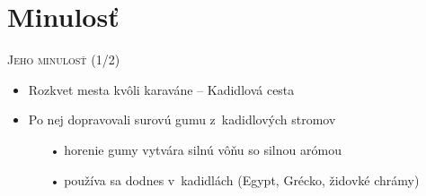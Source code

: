 \documentclass[xcolor=dvipsnames]{beamer}
\begin{document}
\section{Minulosť}
\begin{frame}{\textsc{Jeho minulosť (1/2)}}
\transwipe
	\begin{itemize}
	\item Rozkvet mesta kvôli karaváne -- Kadidlová cesta
	\item Po nej dopravovali surovú gumu z~kadidlových stromov
		\begin{itemize}
		\item[•] horenie gumy vytvára silnú vôňu so silnou arómou
		\item[•] používa sa dodnes v~kadidlách {\scriptsize (Egypt, Grécko, židovké chrámy)}
		\end{itemize}
	\end{itemize}
	\begin{figure}[ht]
		\begin{center}
			 
		\end{center}
	\end{figure}
\end{frame}
\end{document}
